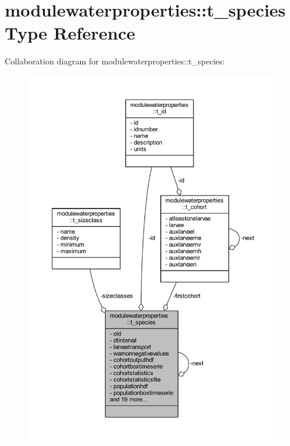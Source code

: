 \hypertarget{structmodulewaterproperties_1_1t__species}{}\section{modulewaterproperties\+:\+:t\+\_\+species Type Reference}
\label{structmodulewaterproperties_1_1t__species}


Collaboration diagram for modulewaterproperties\+:\+:t\+\_\+species\+:\nopagebreak
\begin{figure}[H]
\begin{center}
\leavevmode
\includegraphics[width=350pt]{structmodulewaterproperties_1_1t__species__coll__graph}
\end{center}
\end{figure}
